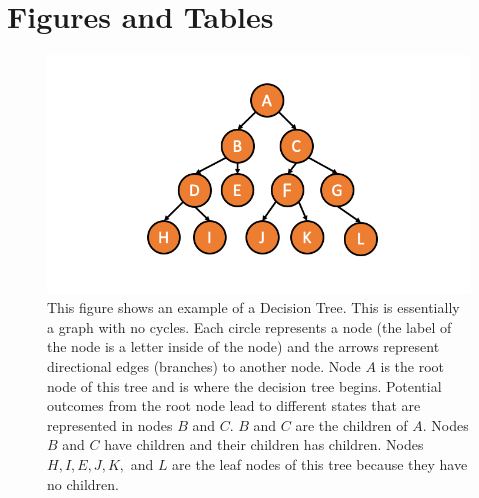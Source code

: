 \clearpage

\section{Figures and Tables}


\begin{figure}[!htb]
    \centering
      \includegraphics[width=\textwidth]{figures/ppt/DecisionTree.png}

    \caption{
	This figure shows an example of a Decision Tree. This is essentially a graph with no cycles.  Each circle represents a node (the label of the node is a letter inside of the node) and the arrows represent directional edges (branches) to another node. Node \(A\) is the root node of this tree and is where the decision tree begins. Potential outcomes from the root node lead to different states that are represented in nodes \(B\) and \(C\). \(B\) and \(C\) are the children of \(A\).  Nodes \(B\) and \(C\) have children and their children has children. Nodes \(H, I, E, J, K,\) and \(L\) are the leaf nodes of this tree because they have no children.
     }
      \label{fig:DecisionTree}
  \end{figure}

